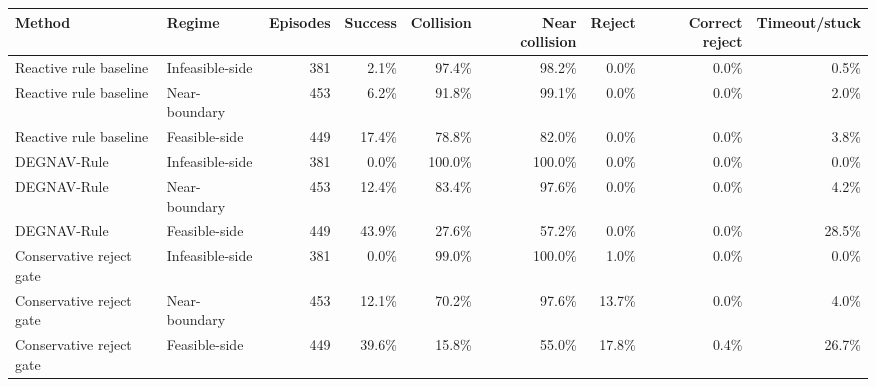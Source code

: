 \begin{tabular}{llrrrrrrr}
\toprule
Method & Regime & Episodes & Success & Collision & Near collision & Reject & Correct reject & Timeout/stuck \\
\midrule
Reactive rule baseline & Infeasible-side & 381 & 2.1\% & 97.4\% & 98.2\% & 0.0\% & 0.0\% & 0.5\% \\
Reactive rule baseline & Near-boundary & 453 & 6.2\% & 91.8\% & 99.1\% & 0.0\% & 0.0\% & 2.0\% \\
Reactive rule baseline & Feasible-side & 449 & 17.4\% & 78.8\% & 82.0\% & 0.0\% & 0.0\% & 3.8\% \\
DEGNAV-Rule & Infeasible-side & 381 & 0.0\% & 100.0\% & 100.0\% & 0.0\% & 0.0\% & 0.0\% \\
DEGNAV-Rule & Near-boundary & 453 & 12.4\% & 83.4\% & 97.6\% & 0.0\% & 0.0\% & 4.2\% \\
DEGNAV-Rule & Feasible-side & 449 & 43.9\% & 27.6\% & 57.2\% & 0.0\% & 0.0\% & 28.5\% \\
Conservative reject gate & Infeasible-side & 381 & 0.0\% & 99.0\% & 100.0\% & 1.0\% & 0.0\% & 0.0\% \\
Conservative reject gate & Near-boundary & 453 & 12.1\% & 70.2\% & 97.6\% & 13.7\% & 0.0\% & 4.0\% \\
Conservative reject gate & Feasible-side & 449 & 39.6\% & 15.8\% & 55.0\% & 17.8\% & 0.4\% & 26.7\% \\
\bottomrule
\end{tabular}
